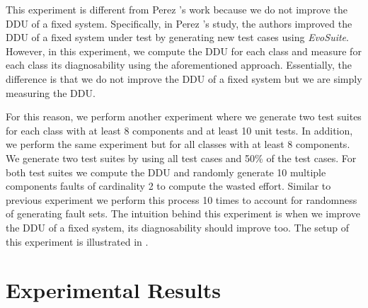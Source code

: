 \documentclass[twoside,a4paper,11pt]{memoir}
\begin{document}
This experiment is different from Perez \etal's work because we do not improve the DDU of a fixed system.
Specifically, in Perez \etal's study, the authors improved the DDU of a fixed system under test by generating new test cases using \emph{EvoSuite}.
However, in this experiment, we compute the DDU for each class and measure for each class its diagnosability using the aforementioned approach.
Essentially, the difference is that we do not improve the DDU of a fixed system but we are simply measuring the DDU.



For this reason, we perform another experiment where we generate two test suites for each class with at least 8 components and at least 10 unit tests.
In addition, we perform the same experiment but for all classes with at least 8 components.
We generate two test suites by using all test cases and 50\% of the test cases.
For both test suites we compute the DDU and randomly generate 10 multiple components faults of cardinality 2 to compute the wasted effort.
Similar to previous experiment we perform this process 10 times to account for randomness of generating fault sets.
The intuition behind this experiment is when we improve the DDU of a fixed system, its diagnosability should improve too.
The setup of this experiment is illustrated in .

\section{Experimental Results}
\label{sec:rq2_experimental_results}
\end{document}
